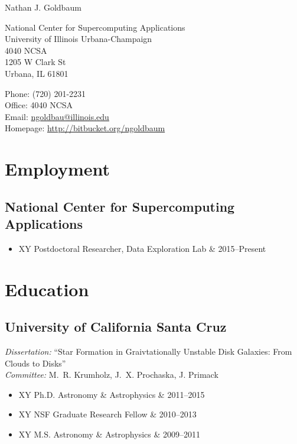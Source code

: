 \documentclass[10pt,letterpaper]{article}
\def\name{Nathan J. Goldbaum}
\newcommand{\textline}[2]{
  \begin{tabularx}{\textwidth}{XY}
  #1 & #2
  \end{tabularx}
}
\begin{document}
{\huge \name}


\bigskip

\begin{minipage}[t]{0.6\textwidth}
  National Center for Supercomputing Applications \\
  University of Illinois Urbana-Champaign \\
  4040 NCSA \\
  1205 W Clark St \\
  Urbana, IL 61801
\end{minipage}
\begin{minipage}[t]{0.4\textwidth}
  Phone: (720) 201-2231 \\
  Office: 4040 NCSA \\
  Email: \href{mailto:ngoldbau@illinois.edu}{ngoldbau@illinois.edu} \\
  Homepage: \href{https://bitbucket.org/ngoldbaum}{http://bitbucket.org/ngoldbaum}
\end{minipage}

\section*{Employment}

\subsection*{National Center for Supercomputing Applications}
  \begin{itemize}
    \item[] \textline{Postdoctoral Researcher, Data Exploration Lab}{2015--Present}
  \end{itemize}

\section*{Education}

\subsection*{University of California Santa Cruz}
\emph{Dissertation:} ``Star Formation in Graivtationally Unstable Disk
Galaxies: From Clouds to Disks''\\
\emph{Committee:} M.~R. Krumholz, J.~X. Prochaska, J. Primack
\begin{itemize}
\item[] \textline{Ph.D. Astronomy \& Astrophysics}{2011--2015}
\item[] \textline{NSF Graduate Research Fellow}{2010--2013}
\item[] \textline{M.S. Astronomy \& Astrophysics}{2009--2011}
\end{itemize}
\end{document}
